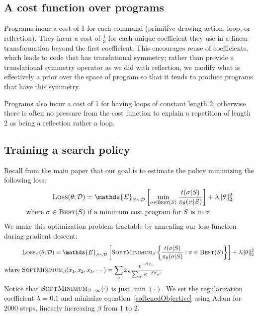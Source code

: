 \documentclass{article}
\newcommand{\expect}{\mathds{E}} %
\theoremstyle{definition}
\begin{document}
\subsection{A cost function over programs}\label{costAppendix}
Programs incur a cost of 1 for each command (primitive drawing action,
loop, or reflection).  They incur a cost of $\frac{1}{3}$ for each
unique coefficient they use in a linear transformation beyond the
first coefficient. This encourages reuse of coefficients, which leads
to code that has translational symmetry; rather than provide a
translational symmetry operator as we did with reflection, we modify
what is effectively a prior over the space of program so that it tends
to produce programs that have this symmetry.

Programs also incur a cost of 1 for having loops of constant length 2;
otherwise there is often no pressure from the cost function to explain
a repetition of length 2 as being a reflection rather a loop.

\subsection{Training a search policy}\label{policyAppendix}
Recall from the main paper that our goal is to estimate the policy minimizing the following loss:
\begin{align}
\textsc{Loss}(\theta ; \mathcal{D})& =  \expect_{S\sim\mathcal{D}}\left[ \min_{\sigma\in \text{\textsc{Best}}(S)}\frac{t(\sigma | S)}{\pi_\theta (\sigma | S)}\right] + \lambda \Vert\theta\Vert_2^2\label{policyLoss}\\
\text{where }  \sigma \in\text{\textsc{Best}}(S) &\text{ if  a minimum cost program for }S \text{ is in }\sigma .\nonumber %
\end{align}
We make this optimization problem tractable by annealing our loss function during gradient descent:
\begin{align}
&  \textsc{Loss}_\beta(\theta ; \mathcal{D}) =  \expect_{S\sim\mathcal{D}}\left[ \textsc{SoftMinimum}_\beta \left\{
    \frac{t(\sigma | S)}{\pi_\theta (\sigma | S)}    : \sigma\in \text{\textsc{Best}}(S)\right\}\right] + \lambda \Vert\theta\Vert_2^2\label{softenedObjective}\\
  \text{where }&\textsc{SoftMinimum}_\beta (x_1,x_2,x_3,\cdots ) = \sum_n x_n  \frac{e^{-\beta x_n}}{\sum_{n'}e^{-\beta x_{n'}}}
\end{align}
Notice that $\textsc{SoftMinimum}_{\beta = \infty}(\cdot )$ is just $\min(\cdot )$.
We set the regularization coefficient $\lambda = 0.1$ and minimize equation~\ref{softenedObjective}
using Adam for 2000 steps, linearly increasing $\beta$ from $1$ to $2$.
\end{document}

